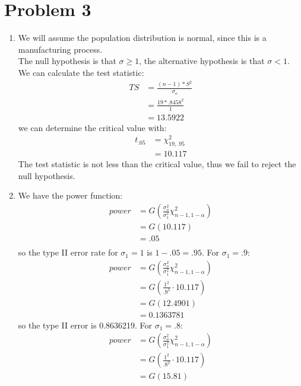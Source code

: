 \documentclass{article}
\begin{document}
\section*{Problem 3}
\begin{enumerate}
\item We will assume the population distribution is normal, since this is a manufacturing process. \\
The null hypothesis is that $\sigma \geq 1$, the alternative hypothesis is that $\sigma < 1$. We can calculate the test statistic: \\
\begin{align*}
TS &= \frac{(n - 1) * S^2}{\sigma_o} \\
&= \frac{19 * .8458^2}{1} \\
&= 13.5922
\end{align*}
we can determine the critical value with: \\
\begin{align*}
t_{.05} &= \chi_{19, .95}^2 \\
&= 10.117
\end{align*}
The test statistic is not less than the critical value, thus we fail to reject the null hypothesis. \\
\item We have the power function: \\
\begin{align*}
power &= G(\frac{\sigma_o^2}{\sigma_1^2}\chi^2_{n - 1, 1 - \alpha}) \\
&= G(10.117) \\
&= .05 \\
\end{align*}
so the type II error rate for $\sigma_1 = 1$ is $1 - .05 = .95$. For $\sigma_1 = .9$: \\
\begin{align*}
power &= G(\frac{\sigma_o^2}{\sigma_1^2}\chi^2_{n - 1, 1 - \alpha}) \\
&= G(\frac{1^2}{.9^2}\cdot 10.117) \\
&= G(12.4901) \\
&= 0.1363781
\end{align*}
so the type II error is 0.8636219. For $\sigma_1 = .8$: \\
\begin{align*}
power &= G(\frac{\sigma_o^2}{\sigma_1^2}\chi^2_{n - 1, 1 - \alpha}) \\
&= G(\frac{1^2}{.8^2}\cdot 10.117) \\
&= G(15.81) \\

\end{align*}
\end{enumerate}
\end{document}

